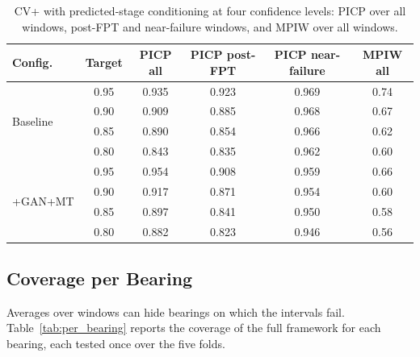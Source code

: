 \begin{table}[htbp]
\centering
\caption{CV+ with predicted-stage conditioning at four confidence
levels: PICP over all windows, post-FPT and near-failure windows, and
MPIW over all windows.}
\label{tab:alpha}
\footnotesize
\renewcommand{\arraystretch}{1.2}
\setlength{\tabcolsep}{4pt}
\begin{tabular}{lccccc}
\toprule
\textbf{Config.} & \textbf{Target} & \textbf{PICP all} &
\textbf{PICP post-FPT} & \textbf{PICP near-failure} & \textbf{MPIW all} \\
\midrule
\multirow{4}{*}{Baseline}
 & 0.95 & 0.935 & 0.923 & 0.969 & 0.74 \\
 & 0.90 & 0.909 & 0.885 & 0.968 & 0.67 \\
 & 0.85 & 0.890 & 0.854 & 0.966 & 0.62 \\
 & 0.80 & 0.843 & 0.835 & 0.962 & 0.60 \\
\midrule
\multirow{4}{*}{+GAN+MT}
 & 0.95 & 0.954 & 0.908 & 0.959 & 0.66 \\
 & 0.90 & 0.917 & 0.871 & 0.954 & 0.60 \\
 & 0.85 & 0.897 & 0.841 & 0.950 & 0.58 \\
 & 0.80 & 0.882 & 0.823 & 0.946 & 0.56 \\
\bottomrule
\end{tabular}
\end{table}

\subsection{Coverage per Bearing}
\label{sec:res_per_bearing}

Averages over windows can hide bearings on which the intervals fail.
Table~\ref{tab:per_bearing} reports the coverage of the full framework
for each bearing, each tested once over the five folds.

